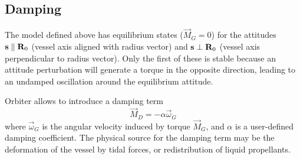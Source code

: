 \documentclass[Orbiter Technical Reference.tex]{subfiles}
\begin{document}
\subsection{Damping}
The model defined above has equilibrium states ($\vec{M}_G = 0$) for the attitudes $\mathbf{s} \parallel \mathbf{R}_{0}$ (vessel axis aligned with radius vector) and $\mathbf{s} \perp \mathbf{R}_{0}$ (vessel axis perpendicular to radius vector). Only the first of these is stable because an attitude perturbation will generate a torque in the opposite direction, leading to an undamped oscillation around the equilibrium attitude.

Orbiter allows to introduce a damping term
\begin{equation*}
\vec{M}_D = -\alpha\vec{\omega}_G
\end{equation*}
where $\vec{\omega}_G$ is the angular velocity induced by torque $\vec{M}_G$, and $\alpha$ is a user-defined damping coefficient. The physical source for the damping term may be the deformation of the vessel by tidal forces, or redistribution of liquid propellants.
\end{document}

